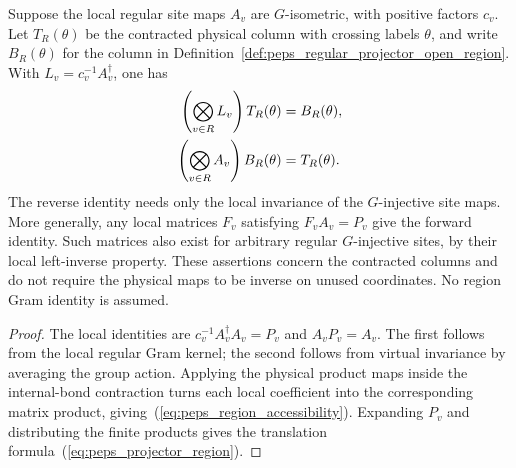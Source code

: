 \begin{lemma}%
    \label{thm:peps_regular_open_region_accessibility}
    \leanok
    Suppose the local regular site maps $A_v$ are $G$-isometric,
    with positive factors $c_v$. Let $T_R(\theta)$ be the
    contracted physical column with crossing labels $\theta$,
    and write $B_R(\theta)$ for the column in
    Definition~\ref{def:peps_regular_projector_open_region}. With
    $L_v=c_v^{-1}A_v^\dagger$, one has
    \begin{align}
        \left(\bigotimes_{v\in R}L_v\right)T_R(\theta)
         & =B_R(\theta),\notag \\
        \left(\bigotimes_{v\in R}A_v\right)B_R(\theta)
         & =T_R(\theta).
        \label{eq:peps_region_accessibility}
    \end{align}
    The reverse identity needs only the local invariance of the
    $G$-injective site maps. More generally, any local matrices
    $F_v$ satisfying $F_vA_v=P_v$ give the forward identity.
    Such matrices also exist for arbitrary regular $G$-injective sites,
    by their local left-inverse property.
    These assertions concern the contracted columns and
    do not require the physical maps to be inverse on unused
    coordinates. No region Gram identity is assumed.
\end{lemma}

\begin{proof}\leanok
    The local identities are
    $c_v^{-1}A_v^\dagger A_v=P_v$ and $A_vP_v=A_v$.
    The first follows from the local regular Gram kernel; the second
    follows from virtual invariance by averaging the group action.
    Applying the physical product maps inside the internal-bond
    contraction turns each local coefficient into the corresponding
    matrix product, giving~(\ref{eq:peps_region_accessibility}).
    Expanding $P_v$ and distributing the finite products gives
    the translation formula~(\ref{eq:peps_projector_region}).
\end{proof}


